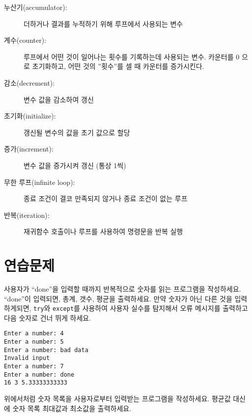 \begin{description}

\item[누산기(accumulator):] 더하거나 결과를 누적하기 위해 루프에서 사용되는 변수

\item[계수(counter):] 루프에서 어떤 것이 일어나는 횟수를 기록하는데 사용되는 변수.
카운터를 0 으로 초기화하고, 어떤 것의 ''횟수''를 셀 때 카운터를 증가시킨다.

\item[감소(decrement):] 변수 값을 감소하여 갱신

\item[초기화(initialize):] 갱신될 변수의 값을 초기 값으로 할당

\item[증가(increment):] 변수 값을 증가시켜 갱신 (통상 1씩)

\item[무한 루프(infinite loop):] 종료 조건이 결코 만족되지 않거나 종료 조건이 없는 루프

\item[반복(iteration):] 재귀함수 호출이나 루프를 사용하여 명령문을 반복 실행

\end{description}

\section{  연습문제}

\begin{ex}
사용자가 ``done''을 입력할 때까지 반복적으로 숫자를 읽는 프로그램을 작성하세요.
``done''이 입력되면, 총계, 갯수, 평균을 출력하세요.
만약 숫자가 아닌 다른 것을 입력하게되면, {\tt try}와 {\tt except}를 사용하여 사용자 실수를 탐지해서
오류 메시지를 출력하고 다음 숫자로 건너 뛰게 하세요.

\begin{verbatim}
Enter a number: 4
Enter a number: 5
Enter a number: bad data
Invalid input
Enter a number: 7
Enter a number: done
16 3 5.33333333333
\end{verbatim}
\end{ex}

\begin{ex}
위에서처럼 숫자 목록을 사용자로부터 입력받는 프로그램을 작성하세요. 
평균값 대신에 숫자 목록 최대값과 최소값을 출력하세요.
\end{ex}


